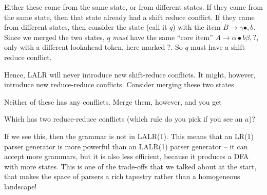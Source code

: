 Either these come from the same state, or from different states. If they came from the same state, then that state already had a shift reduce conflict. If they came from different states, then consider the state (call it $q$) with the item $B \to \gamma \bullet, b$. Since we merged the two states, $q$ \textit{must} have the same ``core item'' $A \to \alpha \bullet b \beta, ?$, only with a different lookahead token, here marked $?$. So $q$ must have a shift-reduce conflict.

Hence, LALR will never introduce new shift-reduce conflicts. It might, however, introduce new reduce-reduce conflicts. Consider merging these two states
\begin{center}
\end{center}
Neither of these has any conflicts. Merge them, however, and you get
\begin{center}
\end{center}
Which has two reduce-reduce conflicts (which rule do you pick if you see an $a$)?

If we see this, then the grammar is not in LALR(1). This means that an LR(1) parser generator is more powerful than an LALR(1) parser generator -- it can accept more grammars, but it is also less efficient, because it produces a DFA with more states. This is one of the trade-offs that we talked about at the start, that makes the space of parsers a rich tapestry rather than a homogeneous landscape!

